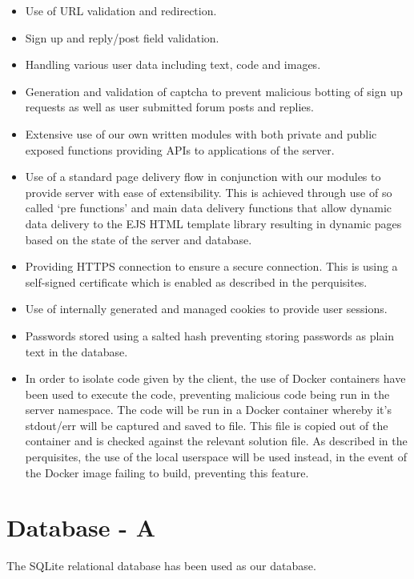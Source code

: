 \documentclass[a4paper]{article}
\begin{document}
\begin{itemize}
  \item{Use of URL validation and redirection.}
  \item{Sign up and reply/post field validation.}
  \item{Handling various user data including text, code and images.}
  \item{Generation and validation of captcha to prevent malicious botting of
    sign up requests as well as user submitted forum posts and replies.}
  \item{Extensive use of our own written modules with both private and public exposed
    functions providing APIs to applications of the server.}
  \item{Use of a standard page delivery flow in conjunction with our modules to
    provide server with ease of extensibility. This is achieved through use of
    so called `pre functions' and main data delivery functions that allow
    dynamic data delivery to the EJS HTML template library resulting in
    dynamic pages based on the state of the server and database.}
  \item{Providing HTTPS connection to ensure a secure connection. This is using
    a self-signed certificate which is enabled as described in the perquisites.}
  \item{Use of internally generated and managed cookies to provide user
    sessions.}
  \item{Passwords stored using a salted hash preventing storing passwords as
    plain text in the database.}
  \item{In order to isolate code given by the client, the use of Docker
    containers have been used to execute the code, preventing malicious code being
    run in the server namespace. The code will be run in a Docker container
    whereby it's stdout/err will be captured and saved to file. This file is
    copied out of the container and is checked against the relevant solution
    file. As described in the perquisites, the use of the local userspace will
    be used instead, in the event of the Docker image failing to build, preventing this
    feature.}
\end{itemize}

\section{Database - A}
The SQLite relational database has been used as our database.
\end{document}
